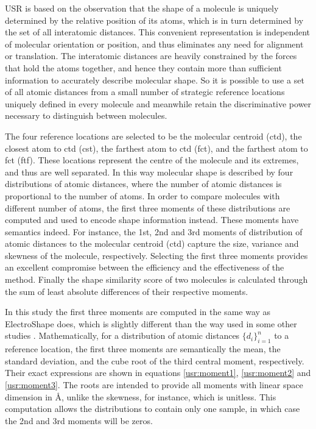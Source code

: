 USR is based on the observation that the shape of a molecule is uniquely determined by the relative position of its atoms, which is in turn determined by the set of all interatomic distances. This convenient representation is independent of molecular orientation or position, and thus eliminates any need for alignment or translation. The interatomic distances are heavily constrained by the forces that hold the atoms together, and hence they contain more than sufficient information to accurately describe molecular shape. So it is possible to use a set of all atomic distances from a small number of strategic reference locations uniquely defined in every molecule and meanwhile retain the discriminative power necessary to distinguish between molecules.

The four reference locations are selected to be the molecular centroid (ctd), the closest atom to ctd (cst), the farthest atom to ctd (fct), and the farthest atom to fct (ftf). These locations represent the centre of the molecule and its extremes, and thus are well separated. In this way molecular shape is described by four distributions of atomic distances, where the number of atomic distances is proportional to the number of atoms. In order to compare molecules with different number of atoms, the first three moments of these distributions are computed and used to encode shape information instead. These moments have semantics indeed. For instance, the 1st, 2nd and 3rd moments of distribution of atomic distances to the molecular centroid (ctd) capture the size, variance and skewness of the molecule, respectively. Selecting the first three moments provides an excellent compromise between the efficiency and the effectiveness of the method. Finally the shape similarity score of two molecules is calculated through the sum of least absolute differences of their respective moments.

In this study the first three moments are computed in the same way as ElectroShape \citep{1337} does, which is slightly different than the way used in some other studies \citep{1379,1332,1380,1331}. Mathematically, for a distribution of atomic distances $\{d_i\}_{i=1}^n$ to a reference location, the first three moments are semantically the mean, the standard deviation, and the cube root of the third central moment, respectively. Their exact expressions are shown in equations \eqref{usr:moment1}, \eqref{usr:moment2} and \eqref{usr:moment3}. The roots are intended to provide all moments with linear space dimension in \AA, unlike the skewness, for instance, which is unitless. This computation allows the distributions to contain only one sample, in which case the 2nd and 3rd moments will be zeros.


